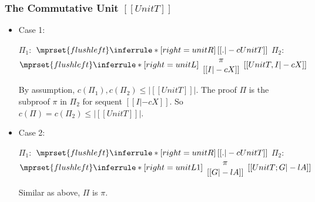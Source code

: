 \subsubsection{The Commutative Unit $[[UnitT]]$}
\begin{itemize}
\item Case 1:
      \begin{center}
        \scriptsize
        $\Pi_1:$
        \begin{math}
          $$\mprset{flushleft}
          \inferrule* [right={\tiny unitR}] {
            \,
          }{[[. |-c UnitT]]}
        \end{math}
        \qquad\qquad
        $\Pi_2:$
        \begin{math}
          $$\mprset{flushleft}
          \inferrule* [right={\tiny unitL}] {
            {
              \begin{array}{c}
                \pi \\
                {[[I |-c X]]}
              \end{array}
            }
          }{[[UnitT, I |-c X]]}
        \end{math}
      \end{center}
      By assumption, $c(\Pi_1),c(\Pi_2)\leq |[[UnitT]]|$. The proof $\Pi$
      is the subproof $\pi$ in $\Pi_2$ for sequent $[[I |-c X]]$. So
      $c(\Pi)=c(\Pi_2)\leq |[[UnitT]]|$.

\item Case 2:
      \begin{center}
        \scriptsize
        $\Pi_1:$
        \begin{math}
          $$\mprset{flushleft}
          \inferrule* [right={\tiny unitR}] {
            \,
          }{[[. |-c UnitT]]}
        \end{math}
        \qquad\qquad
        $\Pi_2:$
        \begin{math}
          $$\mprset{flushleft}
          \inferrule* [right={\tiny unitL1}] {
            {
              \begin{array}{c}
                \pi \\
                {[[G |-l A]]}
              \end{array}
            }
          }{[[UnitT; G |-l A]]}
        \end{math}
      \end{center}
      Similar as above, $\Pi$ is $\pi$.
\end{itemize}


